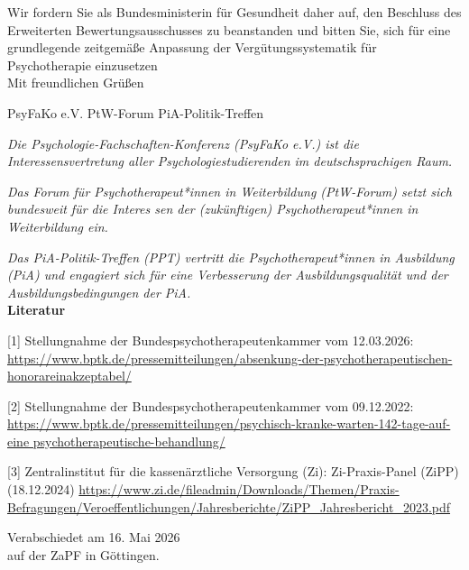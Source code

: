 \documentclass[DIV=calc]{scrartcl}
\begin{document}
Wir fordern Sie als Bundesministerin für Gesundheit daher auf, den Beschluss des Erweiterten 
Bewertungsausschusses zu beanstanden und bitten Sie, sich für eine grundlegende zeitgemäße 
Anpassung der Vergütungssystematik für Psychotherapie einzusetzen\\

Mit freundlichen Grüßen

PsyFaKo e.V.    \quad PtW-Forum  \quad  PiA-Politik-Treffen

\textit{Die Psychologie-Fachschaften-Konferenz (PsyFaKo e.V.) ist die Interessensvertretung aller 
Psychologiestudierenden im deutschsprachigen Raum.}

\textit{Das Forum für Psychotherapeut*innen in Weiterbildung (PtW-Forum) setzt sich bundesweit für die Interes
sen der (zukünftigen) Psychotherapeut*innen in Weiterbildung ein.}

\textit{Das PiA-Politik-Treffen (PPT) vertritt die Psychotherapeut*innen in Ausbildung (PiA) und engagiert sich für 
eine Verbesserung der Ausbildungsqualität und der Ausbildungsbedingungen der PiA.}\\

\textbf{Literatur}

[1] Stellungnahme der Bundespsychotherapeutenkammer vom 12.03.2026:
\url{https://www.bptk.de/pressemitteilungen/absenkung-der-psychotherapeutischen-honorareinakzeptabel/}

[2] Stellungnahme der Bundespsychotherapeutenkammer vom 09.12.2022: \url{https://www.bptk.de/pressemitteilungen/psychisch-kranke-warten-142-tage-auf-eine psychotherapeutische-behandlung/}

[3] Zentralinstitut für die kassenärztliche Versorgung (Zi): Zi-Praxis-Panel (ZiPP) (18.12.2024) \url{https://www.zi.de/fileadmin/Downloads/Themen/Praxis-Befragungen/Veroeffentlichungen/Jahresberichte/ZiPP_Jahresbericht_2023.pdf}

\vspace{1cm} 
%
\vfill
\begin{flushright}
	Verabschiedet am 16. Mai 2026 \\
	auf der ZaPF in Göttingen.
\end{flushright}
\end{document}
